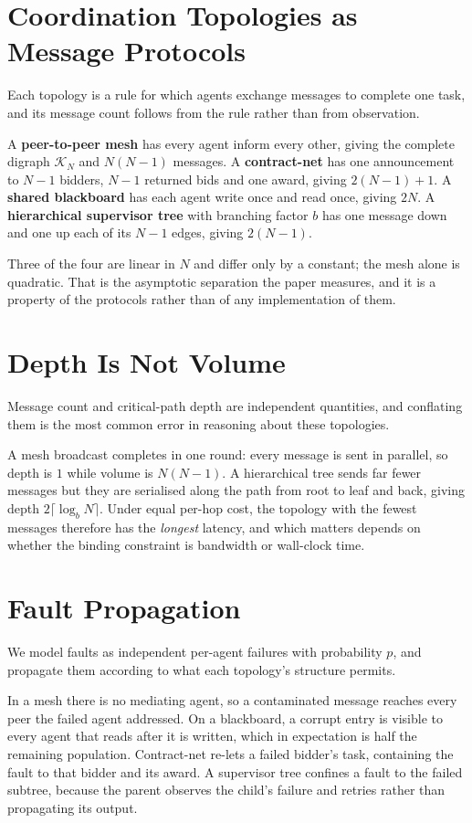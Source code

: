 \documentclass{article}
\begin{document}
\section{Coordination Topologies as Message Protocols}


Each topology is a rule for which agents exchange messages to complete one task, and its message count follows from the rule rather than from observation.

A \textbf{peer-to-peer mesh} has every agent inform every other, giving the complete digraph $\mathcal{K}_N$ and $N(N-1)$ messages. A \textbf{contract-net} has one announcement to $N-1$ bidders, $N-1$ returned bids and one award, giving $2(N-1)+1$. A \textbf{shared blackboard} has each agent write once and read once, giving $2N$. A \textbf{hierarchical supervisor tree} with branching factor $b$ has one message down and one up each of its $N-1$ edges, giving $2(N-1)$.

Three of the four are linear in $N$ and differ only by a constant; the mesh alone is quadratic. That is the asymptotic separation the paper measures, and it is a property of the protocols rather than of any implementation of them.


\section{Depth Is Not Volume}


Message count and critical-path depth are independent quantities, and conflating them is the most common error in reasoning about these topologies.

A mesh broadcast completes in one round: every message is sent in parallel, so depth is $1$ while volume is $N(N-1)$. A hierarchical tree sends far fewer messages but they are serialised along the path from root to leaf and back, giving depth $2\lceil \log_b N \rceil$. Under equal per-hop cost, the topology with the fewest messages therefore has the \textit{longest} latency, and which matters depends on whether the binding constraint is bandwidth or wall-clock time.


\section{Fault Propagation}


We model faults as independent per-agent failures with probability $p$, and propagate them according to what each topology's structure permits.

In a mesh there is no mediating agent, so a contaminated message reaches every peer the failed agent addressed. On a blackboard, a corrupt entry is visible to every agent that reads after it is written, which in expectation is half the remaining population. Contract-net re-lets a failed bidder's task, containing the fault to that bidder and its award. A supervisor tree confines a fault to the failed subtree, because the parent observes the child's failure and retries rather than propagating its output.
\end{document}

